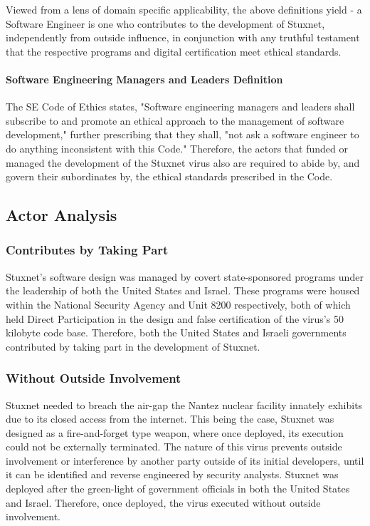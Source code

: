 \documentclass[12pt]{article}
\begin{document}
\begin{multicols}{2}
Viewed from a lens of domain specific applicability, the above definitions yield - a Software Engineer is one who contributes to the development of Stuxnet, independently from outside influence, in conjunction with any truthful testament that the respective programs and digital certification meet ethical standards.

\paragraph{Software Engineering Managers and Leaders Definition}

The SE Code of Ethics states, "Software engineering managers and leaders shall subscribe to and promote an ethical approach to the management of software development," further prescribing that they shall, "not ask a software engineer to do anything inconsistent with this Code."\cite{softwareEngineeringCodeOfEthics} Therefore, the actors that funded or managed the development of the Stuxnet virus also are required to abide by, and govern their subordinates by, the ethical standards prescribed in the Code.

\subsection{Actor Analysis}

\subsubsection{Contributes by Taking Part}

Stuxnet's software design was managed by covert state-sponsored programs under the leadership of both the United States and Israel. These programs were housed within the National Security Agency and Unit 8200 respectively, both of which held Direct Participation in the design and false certification of the virus's 50 kilobyte code base.\cite{NationalSecurityAgencyAndUnit8200}\cite{w32.stuxnetDossier} Therefore, both the United States and Israeli governments contributed by taking part in the development of Stuxnet.

\subsubsection{Without Outside Involvement}

Stuxnet needed to breach the air-gap the Nantez nuclear facility innately exhibits due to its closed access from the internet. This being the case, Stuxnet was designed as a fire-and-forget type weapon, where once deployed, its execution could not be externally terminated.\cite{stuxnetFireandForget} The nature of this virus prevents outside involvement or interference by another party outside of its initial developers, until it can be identified and reverse engineered by security analysts. Stuxnet was deployed after the green-light of government officials in both the United States and Israel. Therefore, once deployed, the virus executed without outside involvement.



\end{multicols}
\end{document}
